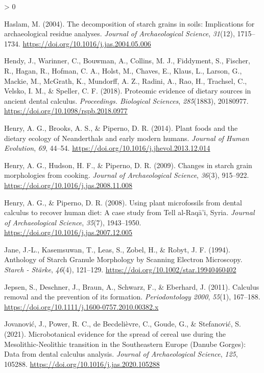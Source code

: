 \documentclass[
]{article}
\newlength{\cslhangindent}
\newenvironment{CSLReferences}[2] %
 {%
  \setlength{\parindent}{0pt}
  \ifodd #1 \everypar{\setlength{\hangindent}{\cslhangindent}}\ignorespaces\fi
  \ifnum #2 > 0
  \setlength{\parskip}{#2\baselineskip}
  \fi
 }%
 {}
\begin{document}
\begin{CSLReferences}{1}{0}
\leavevmode\hypertarget{ref-haslamDecompositionStarch2004}{}%
Haslam, M. (2004). The decomposition of starch grains in soils: Implications for archaeological residue analyses. \emph{Journal of Archaeological Science}, \emph{31}(12), 1715--1734. \url{https://doi.org/10.1016/j.jas.2004.05.006}

\leavevmode\hypertarget{ref-hendyProteomicCalculus2018}{}%
Hendy, J., Warinner, C., Bouwman, A., Collins, M. J., Fiddyment, S., Fischer, R., Hagan, R., Hofman, C. A., Holst, M., Chaves, E., Klaus, L., Larson, G., Mackie, M., McGrath, K., Mundorff, A. Z., Radini, A., Rao, H., Trachsel, C., Velsko, I. M., \& Speller, C. F. (2018). Proteomic evidence of dietary sources in ancient dental calculus. \emph{Proceedings. Biological Sciences}, \emph{285}(1883), 20180977. \url{https://doi.org/10.1098/rspb.2018.0977}

\leavevmode\hypertarget{ref-henryNeanderthalCalculus2014}{}%
Henry, A. G., Brooks, A. S., \& Piperno, D. R. (2014). Plant foods and the dietary ecology of {Neanderthals} and early modern humans. \emph{Journal of Human Evolution}, \emph{69}, 44--54. \url{https://doi.org/10.1016/j.jhevol.2013.12.014}

\leavevmode\hypertarget{ref-henryCookingStarch2009}{}%
Henry, A. G., Hudson, H. F., \& Piperno, D. R. (2009). Changes in starch grain morphologies from cooking. \emph{Journal of Archaeological Science}, \emph{36}(3), 915--922. \url{https://doi.org/10.1016/j.jas.2008.11.008}

\leavevmode\hypertarget{ref-henryCalculusSyria2008}{}%
Henry, A. G., \& Piperno, D. R. (2008). Using plant microfossils from dental calculus to recover human diet: A case study from {Tell} al-{Raqā}'i, {Syria}. \emph{Journal of Archaeological Science}, \emph{35}(7), 1943--1950. \url{https://doi.org/10.1016/j.jas.2007.12.005}

\leavevmode\hypertarget{ref-janeAnthologyStarch1994}{}%
Jane, J.-L., Kasemsuwan, T., Leas, S., Zobel, H., \& Robyt, J. F. (1994). Anthology of {Starch Granule Morphology} by {Scanning Electron Microscopy}. \emph{Starch - Stärke}, \emph{46}(4), 121--129. \url{https://doi.org/10.1002/star.19940460402}

\leavevmode\hypertarget{ref-jepsenCalculusRemoval2011}{}%
Jepsen, S., Deschner, J., Braun, A., Schwarz, F., \& Eberhard, J. (2011). Calculus removal and the prevention of its formation. \emph{Periodontology 2000}, \emph{55}(1), 167--188. \url{https://doi.org/10.1111/j.1600-0757.2010.00382.x}

\leavevmode\hypertarget{ref-jovanovicNeolithicCalculus2021}{}%
Jovanović, J., Power, R. C., de Becdelièvre, C., Goude, G., \& Stefanović, S. (2021). Microbotanical evidence for the spread of cereal use during the {Mesolithic}-{Neolithic} transition in the {Southeastern Europe} ({Danube Gorges}): {Data} from dental calculus analysis. \emph{Journal of Archaeological Science}, \emph{125}, 105288. \url{https://doi.org/10.1016/j.jas.2020.105288}


\end{CSLReferences}
\end{document}
